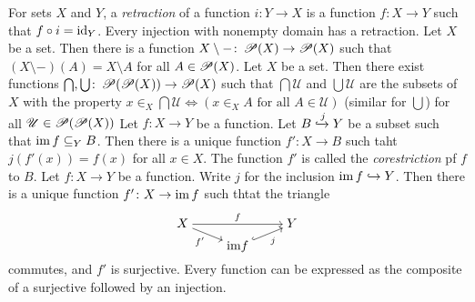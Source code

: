  For sets $X$ and $Y$, a \textit{retraction} of a function $i \colon Y \to X$ is a function $f \colon X \to Y$ such that $f \circ i = \operatorname{id}_Y$.
 Every injection with nonempty domain has a retraction.
 Let $X$ be a set. Then there is a function $X \setminus - \colon \operatorname{\mathscr{P}}(X) \to \operatorname{\mathscr{P}}(X)$ such that $(X \setminus -) (A) = X \setminus A$ for all $A \in \operatorname{\mathscr{P}}(X)$.
 Let $X$ be a set. Then there exist functions $\bigcap, \bigcup \colon \operatorname{\mathscr{P}}(\operatorname{\mathscr{P}}(X)) \to \operatorname{\mathscr{P}}(X)$ such that $\bigcap \mathscr{U}$ and $\bigcup \mathscr{U}$ are the subsets of $X$ with the property $x \in_X \bigcap \mathscr{U} \iff (x \in_X A \text{ for all } A \in \mathscr{U})$ (similar for $\bigcup$) for all $\mathscr{U} \in \operatorname{\mathscr{P}}(\operatorname{\mathscr{P}}(X))$
 Let $f \colon X \to Y$ be a function. Let $B \xhookrightarrow{j} Y$ be a subset such that $\operatorname{im} f \subseteq_Y B$. Then there is a unique function $f' \colon X \to B$ such taht $j(f'(x)) = f(x)$ for all $x \in X$. The function $f'$ is called the \textit{corestriction} pf $f$ to $B$.
 Let $f \colon X \to Y$ be a function. Write $j$ for the inclusion $\operatorname{im} f \hookrightarrow Y$. Then there is a unique function $f' \colon X \to \operatorname{im} f$ such thtat the triangle
\[\begin{tikzcd}[cramped,row sep=tiny]
	X && Y \\
	& {\text{im} f}
	\arrow["f", from=1-1, to=1-3]
	\arrow["{f'}"', from=1-1, to=2-2]
	\arrow["j"', hook, from=2-2, to=1-3]
\end{tikzcd}\]
commutes, and $f'$ is surjective.
 Every function can be expressed as the composite of a surjective followed by an injection.